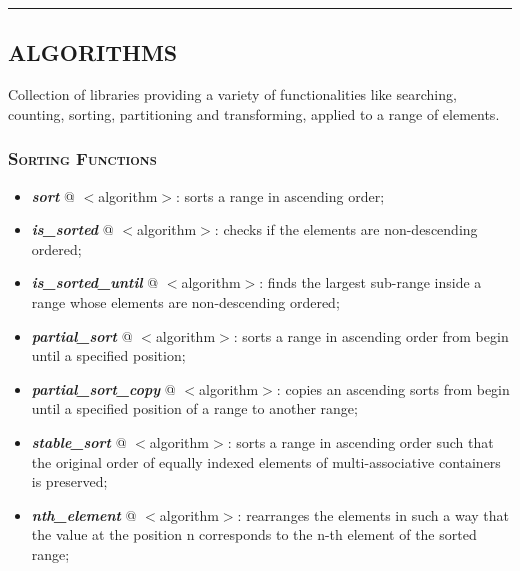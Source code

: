 \documentclass[10pt]{article}
\begin{document}
\begin{multicols*}{5}
{\par\noindent\rule{155pt}{0.4pt}

{\color{Blue}
\subsection*{ALGORITHMS}	
\noindent
Collection of libraries providing a variety of functionalities like searching, counting, sorting, partitioning and transforming, applied to a range of elements.

\subsubsection*{\textsc{Sorting Functions}} 
\begin{itemize}[leftmargin=*,topsep=0.25pt]
  \setlength\itemsep{-1.8pt}
	\item  \emph{\textbf{sort}} @ $<$algorithm$>$: sorts a range in ascending order;
	\item  \emph{\textbf{is\_sorted}} @ $<$algorithm$>$: checks if the elements are non-descending ordered;
	\item  \emph{\textbf{is\_sorted\_until}} @ $<$algorithm$>$: finds the largest sub-range inside a range whose elements are non-descending ordered;
	\item  \emph{\textbf{partial\_sort}} @ $<$algorithm$>$: sorts a range in ascending order from begin until a specified position;
	\item  \emph{\textbf{partial\_sort\_copy}} @ $<$algorithm$>$: copies an ascending sorts from begin until a specified position of a range to another range;
	\item  \emph{\textbf{stable\_sort}} @ $<$algorithm$>$: sorts a range in ascending order such that the original order of equally indexed elements of multi-associative containers is preserved;
	\item  \emph{\textbf{nth\_element}} @ $<$algorithm$>$: rearranges the elements in such a way that the value at the position n corresponds to the n-th element of the sorted range;
\end{itemize}

}}
\end{multicols*}
\end{document}
